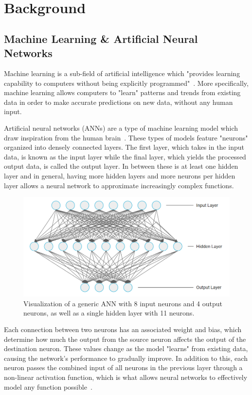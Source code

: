 \section{Background}\label{sec:background}
\subsection{Machine Learning \& Artificial Neural Networks}\label{subsec:machine-learning-and-neural-networks}
Machine learning is a sub-field of artificial intelligence which "provides learning capability to computers
without being explicitly programmed"~\cite{Alzubi_2018}.
More specifically, machine learning allows computers to "learn" patterns and trends from existing data in order to make accurate predictions on new data, without any human input.

Artificial neural networks (ANNs) are a type of machine learning model which draw inspiration from the human brain~\cite{Wang2003}.
These types of models feature "neurons" organized into densely connected layers.
The first layer, which takes in the input data, is known as the input layer while the final layer, which yields the processed output data, is called the output layer.
In between these is at least one hidden layer and in general, having more hidden layers and more neurons per hidden layer allows a neural network to approximate increasingly complex functions.

\begin{figure}[h]
    \centering
    \captionsetup{justification=centering}
    \includegraphics[width=\linewidth]{figures/ann}
    \caption{Visualization of a generic ANN with 8 input neurons and 4 output neurons, as well as a single hidden layer with 11 neurons.}
    \label{fig:ann}
\end{figure}

Each connection between two neurons has an associated weight and bias, which determine how much the output from the source neuron affects the output of the destination neuron.
These values change as the model "learns" from existing data, causing the network's performance to gradually improve.
In addition to this, each neuron passes the combined input of all neurons in the previous layer through a non-linear activation function, which is what allows neural networks to effectively model any function possible~\cite{Wang2003}.

